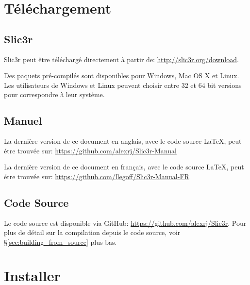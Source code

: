 

\section{T\'el\'echargement}

\subsection{Slic3r} %
\label{sub:slic3r}
Slic3r peut \^etre t\'el\'echarg\'e directement \`a partir de: \url{http://slic3r.org/download}.

Des paquets pr\'e-compil\'es sont disponibles pour Windows, Mac OS X et Linux. Les utilisateurs de Windows et Linux peuvent choisir entre 32 et 64 bit versions pour correspondre \`a leur syst\`eme.

\subsection{Manuel} %
\label{sub:manual}

La derni\`ere version de ce document en anglais, avec le code source {\LaTeX}, peut \'etre trouv\'ee sur: \url{https://github.com/alexrj/Slic3r-Manual}

La derni\`ere version de ce document en fran\c{c}ais, avec le code source {\LaTeX}, peut \'etre trouv\'ee sur: \url{https://github.com/llegoff/Slic3r-Manual-FR}


\subsection{Code Source} %
\label{sub:source}

Le code source est disponible via GitHub: \url{https://github.com/alexrj/Slic3r}. Pour plus de d\'etail sur la compilation depuis le code source, voir §\ref{sec:building_from_source} plus bas.


\section{Installer}


